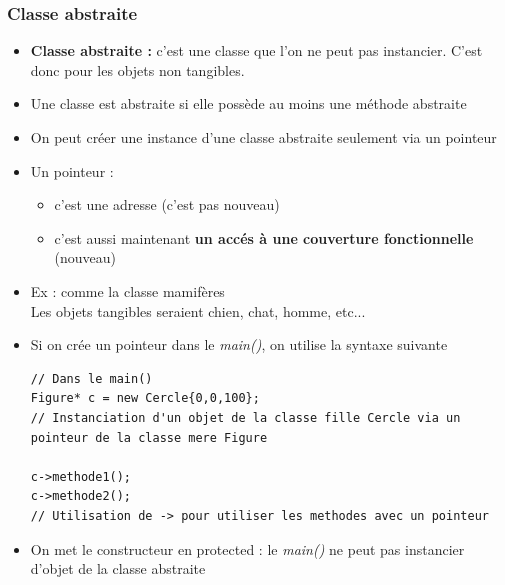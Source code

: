 \documentclass[12pt,a4paper]{article}
\begin{document}
\subsubsection{Classe abstraite}
\begin{itemize}
\item \textbf{Classe abstraite :} c'est une classe que l'on ne peut pas instancier. C'est donc pour les objets non tangibles.
\item Une classe est abstraite si elle possède au moins une méthode abstraite
\item On peut créer une instance d'une classe abstraite seulement via un pointeur
\item Un pointeur : 
\begin{itemize}
\item c'est une adresse (c'est pas nouveau)
\item c'est aussi maintenant \textbf{un accés à une couverture fonctionnelle} (nouveau)
\end{itemize}
\item Ex : comme la classe mamifères\\
Les objets tangibles seraient chien, chat, homme, etc...
\item Si on crée un pointeur dans le \textit{main()}, on utilise la syntaxe suivante
\begin{lstlisting}
// Dans le main()
Figure* c = new Cercle{0,0,100};
// Instanciation d'un objet de la classe fille Cercle via un pointeur de la classe mere Figure

c->methode1();
c->methode2();
// Utilisation de -> pour utiliser les methodes avec un pointeur
\end{lstlisting}
\item On met le constructeur en protected : le \textit{main()} ne peut pas instancier d'objet de la classe abstraite
\end{itemize}
\end{document}
